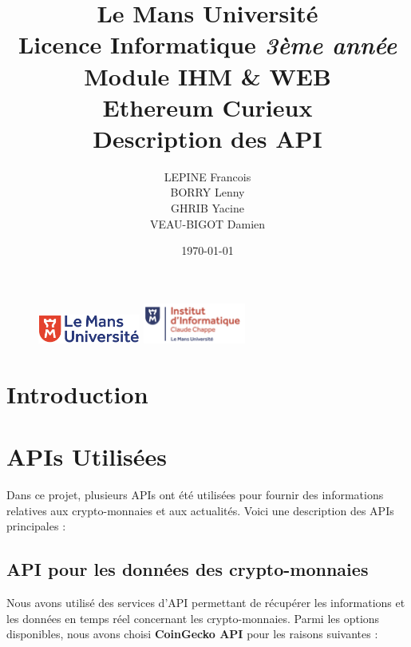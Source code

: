 \documentclass[a4paper,11pt]{article}
\begin{document}
\begin{figure}
\includegraphics[width=0.3\textwidth]{images/logolemansU.png}
\hspace{150pt} 
\includegraphics[width=0.3\textwidth]{images/logo_ic2.png} 
\end{figure}

\title{\textbf{\color{blue} Le Mans Universit\'e}\color{black}
\\ Licence Informatique \textit{3\`eme ann\'ee}
\\ Module IHM \& WEB
\\ Ethereum Curieux 
\\ \textbf{Description des API}} 
\author{LEPINE Francois\\BORRY Lenny\\GHRIB Yacine\\VEAU-BIGOT Damien}
\date{\today} 
\maketitle 
\newpage

\tableofcontents
\newpage

\section{Introduction}

\section{APIs Utilis\'ees}
Dans ce projet, plusieurs APIs ont été utilisées pour fournir des informations relatives aux crypto-monnaies et aux actualités. Voici une description des APIs principales :

\subsection{API pour les donn\'ees des crypto-monnaies}
Nous avons utilis\'e des services d'API permettant de r\'ecup\'erer les informations et les donn\'ees en temps r\'eel concernant les crypto-monnaies. Parmi les options disponibles, nous avons choisi \textbf{CoinGecko API} pour les raisons suivantes :
\end{document}
